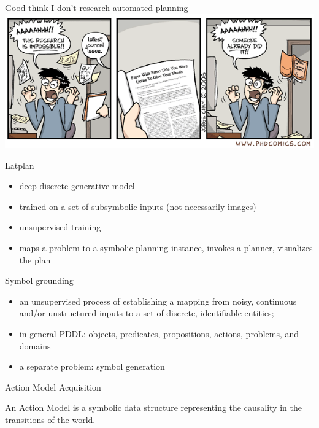 \documentclass{lecture}
\begin{document}
\begin{frame}{Good think I don't research automated planning}
    \includegraphics[width=\textwidth]{phd112006s.png}
\end{frame}

\begin{frame}{Latplan}
    \begin{itemize}
        \item deep discrete generative model
        \item trained on a set of subsymbolic inputs (not necessarily images)
        \item unsupervised training
        \item maps a problem to a symbolic planning instance, invokes a planner, visualizes the plan
    \end{itemize}   
\end{frame}


\begin{frame}{Symbol grounding}
    \begin{itemize}
        \item an unsupervised process of establishing a mapping from
        noisy, continuous and/or unstructured inputs to a set of discrete, identifiable entities;
        \item in general PDDL: objects, predicates, propositions, actions, problems, and domains
        \item a separate problem: symbol generation
    \end{itemize}
\end{frame}

\begin{frame}{Action Model Acquisition}
    \begin{block}{}
    An Action Model is a symbolic data structure representing the causality
in the transitions of the world. 
    \end{block}
\end{frame}
\end{document}
